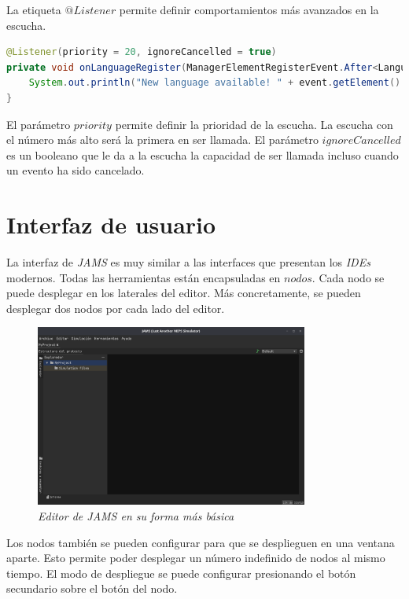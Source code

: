 La etiqueta $@Listener$ permite definir comportamientos más avanzados en la escucha.

\begin{lstlisting}[language=Java,style=java,frame=single,label={lst:escuchas-avanzadas}]
@Listener(priority = 20, ignoreCancelled = true)
private void onLanguageRegister(ManagerElementRegisterEvent.After<Language> event) {
    System.out.println("New language available! " + event.getElement().getName());
}
\end{lstlisting}

\noindent El parámetro $priority$ permite definir la prioridad de la escucha.
La escucha con el número más alto será la primera en ser llamada.
El parámetro $ignoreCancelled$ es un booleano que le da a la escucha la capacidad
de ser llamada incluso cuando un evento ha sido cancelado.


\section{Interfaz de usuario}\label{sec:interfaz-de-usuario}

La interfaz de \textit{JAMS} es muy similar a las interfaces que presentan los \textit{IDEs} modernos.
Todas las herramientas están encapsuladas en $nodos$.
Cada nodo se puede desplegar en los laterales del editor.
Más concretamente, se pueden desplegar dos nodos por cada lado del editor.

\begin{figure}[H]
    \centering
    \includegraphics[width=0.8\textwidth]{images/base/jams-basic}
    \caption{\textit{Editor de \textit{JAMS} en su forma más básica}}
    \label{fig:jams-basic}
\end{figure}

\noindent Los nodos también se pueden configurar para que se desplieguen en una ventana aparte.
Esto permite poder desplegar un número indefinido de nodos al mismo tiempo.
El modo de despliegue se puede configurar presionando el botón secundario sobre
el botón del nodo.

